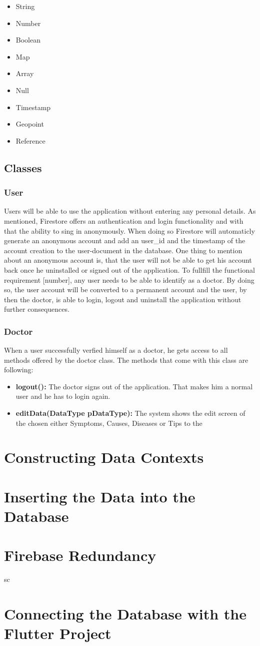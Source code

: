 \begin{itemize}
	\item String
	\item Number
	\item Boolean
	\item Map
	\item Array
	\item Null
	\item Timestamp
	\item Geopoint
	\item Reference
\end{itemize}

\subsection{Classes}
\subsubsection{User}
Users will be able to use the application without entering any personal details. As mentioned, Firestore offers an authentication and login functionality and with that the ability to sing in anonymously. When doing so Firestore will automaticly generate an anonymous account and add an user\_id and the timestamp of the account creation to the user-document in the database. One thing to mention about an anonymous account is, that the user will not be able to get his account back once he uninstalled or signed out of the application.
To fullfill the functional requirement [number], any user needs to be able to identify as a doctor. By doing so, the user account will be converted to a permanent account and the user, by then the doctor, is able to login, logout and uninstall the application without further consequences.
\subsubsection{Doctor}
When a user successfully verfied himself as a doctor, he gets access to all methods offered by the doctor class. The methods that come with this class are following:
\begin{itemize}
	\item \textbf{logout():} The doctor signs out of the application. That makes him a normal user and he has to login again.
	\item \textbf{editData(DataType pDataType):} The system shows the edit screen of the chosen either Symptoms, Causes, Diseases or Tips to the  
	
\end{itemize}
\section{Constructing Data Contexts}
\section{Inserting the Data into the Database}
\section{Firebase Redundancy}sc
\section{Connecting the Database with the Flutter Project}
